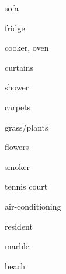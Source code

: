 \documentclass[avery5371,grid,frame]{flashcards}
\begin{document}
\begin{flashcard}{\LARGE sofa}
\LARGE {}
\end{flashcard}
\begin{flashcard}{\LARGE fridge}
\LARGE {}
\end{flashcard}
\begin{flashcard}{\LARGE cooker, oven}
\LARGE {}
\end{flashcard}
\begin{flashcard}{\LARGE curtains}
\LARGE {}
\end{flashcard}
\begin{flashcard}{\LARGE shower}
\LARGE {}
\end{flashcard}
\begin{flashcard}{\LARGE carpets}
\LARGE {}
\end{flashcard}
\begin{flashcard}{\LARGE grass/plants}
\LARGE {}
\end{flashcard}
\begin{flashcard}{\LARGE flowers}
\LARGE {}
\end{flashcard}
\begin{flashcard}{\LARGE smoker}
\LARGE {}
\end{flashcard}
\begin{flashcard}{\LARGE tennis court}
\LARGE {}
\end{flashcard}
\begin{flashcard}{\LARGE air-conditioning}
\LARGE {}
\end{flashcard}
\begin{flashcard}{\LARGE resident}
\LARGE {}
\end{flashcard}
\begin{flashcard}{\LARGE marble}
\LARGE {}
\end{flashcard}
\begin{flashcard}{\LARGE beach}
\LARGE {}
\end{flashcard}
\end{document}
